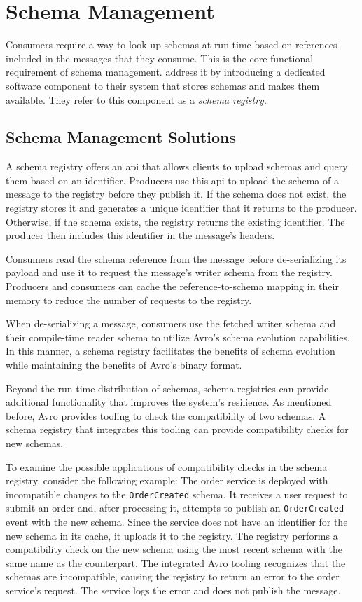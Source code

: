 
\section{Schema Management}\label{sec:schema-management}

Consumers require a way to look up schemas at run-time based on references included in the messages that they consume.
This is the core functional requirement of schema management.
\cite{kreps_kafka_2011} address it by introducing a dedicated software component to their system that stores schemas and makes them available.
They refer to this component as a \emph{schema registry}.

\subsection{Schema Management Solutions}

A schema registry offers an \gls{api} that allows clients to upload schemas and query them based on an identifier.
Producers use this \gls{api} to upload the schema of a message to the registry before they publish it.
If the schema does not exist, the registry stores it and generates a unique identifier that it returns to the producer.
Otherwise, if the schema exists, the registry returns the existing identifier.
The producer then includes this identifier in the message's headers.

Consumers read the schema reference from the message before de-serializing its payload and use it to request the message's writer schema from the registry.
Producers and consumers can cache the reference-to-schema mapping in their memory to reduce the number of requests to the registry.

When de-serializing a message, consumers use the fetched writer schema and their compile-time reader schema to utilize Avro's schema evolution capabilities.
In this manner, a schema registry facilitates the benefits of schema evolution while maintaining the benefits of Avro's binary format.

Beyond the run-time distribution of schemas, schema registries can provide additional functionality that improves the system's resilience.
As mentioned before, Avro provides tooling to check the compatibility of two schemas.
A schema registry that integrates this tooling can provide compatibility checks for new schemas.

To examine the possible applications of compatibility checks in the schema registry, consider the following example:
The order service is deployed with incompatible changes to the \texttt{OrderCreated} schema.
It receives a user request to submit an order and, after processing it, attempts to publish an \texttt{OrderCreated} event with the new schema.
Since the service does not have an identifier for the new schema in its cache, it uploads it to the registry.
The registry performs a compatibility check on the new schema using the most recent schema with the same name as the counterpart.
The integrated Avro tooling recognizes that the schemas are incompatible, causing the registry to return an error to the order service's request.
The service logs the error and does not publish the message.

